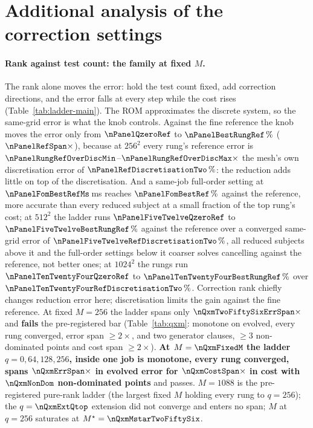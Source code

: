 \section{Additional analysis of the correction settings}
\label{app:interpretation}
\paragraph{Rank against test count: the family at fixed $M$.}
The rank alone moves the error: hold the test count fixed, add correction
directions, and the error falls at every step while the cost rises
(Table~\ref{tab:ladder-main}). The ROM approximates the discrete system,
so the same-grid error is what the knob controls. Against the fine reference the knob moves the error only from
$\nPanelQzeroRef$ to $\nPanelBestRungRef\,\%$ ($\nPanelRefSpan\times$),
because at $256^2$ every rung's reference error is
$\nPanelRungRefOverDiscMin$--$\nPanelRungRefOverDiscMax\times$ the mesh's
own discretisation error of $\nPanelRefDiscretisationTwo\,\%$: the
reduction adds little on top of the discretisation. And a same-job full-order setting at $\nPanelFomBestRefMs$\,ms
reaches $\nPanelFomBestRef\,\%$ against the reference, more accurate than
every reduced subject at a small fraction of the top rung's cost; at
$512^2$ the ladder runs $\nPanelFiveTwelveQzeroRef$ to
$\nPanelFiveTwelveBestRungRef\,\%$ against the reference over a converged
same-grid error of $\nPanelFiveTwelveRefDiscretisationTwo\,\%$, all
\nPanelFiveTwelveReducedAboveDiscCount{} reduced subjects above it
and the \nPanelFiveTwelveFomBelowDiscCount{} full-order settings below it
coarser solves cancelling against the reference, not better ones; at $1024^2$
the rungs run $\nPanelTenTwentyFourQzeroRef$ to
$\nPanelTenTwentyFourBestRungRef\,\%$ over
$\nPanelTenTwentyFourRefDiscretisationTwo\,\%$. Correction rank chiefly changes reduction error here; discretisation
limits the gain against the fine reference. At fixed $M=256$ the ladder spans only $\nQxmTwoFiftySixErrSpan\times$
and \textbf{fails} the pre-registered bar
(Table~\ref{tab:qxm}: monotone on evolved, every rung converged, error
span $\ge2\times$, and two generator clauses, $\ge3$ non-dominated points
and cost span $\ge2\times$). \textbf{At $M=\nQxmFixedM$ the ladder $q=0,64,128,256$,
inside one job is monotone, every rung converged, spans
$\nQxmErrSpan\times$ in evolved error for $\nQxmCostSpan\times$ in cost
with $\nQxmNonDom$ non-dominated points} and passes. $M=1088$ is the pre-registered pure-rank ladder (the largest fixed
$M$ holding every rung to $q=256$); the $q=\nQxmExtQtop$ extension did not converge and enters no span; $M$ at $q=256$
saturates at $M^\star=\nQxmMstarTwoFiftySix$.

